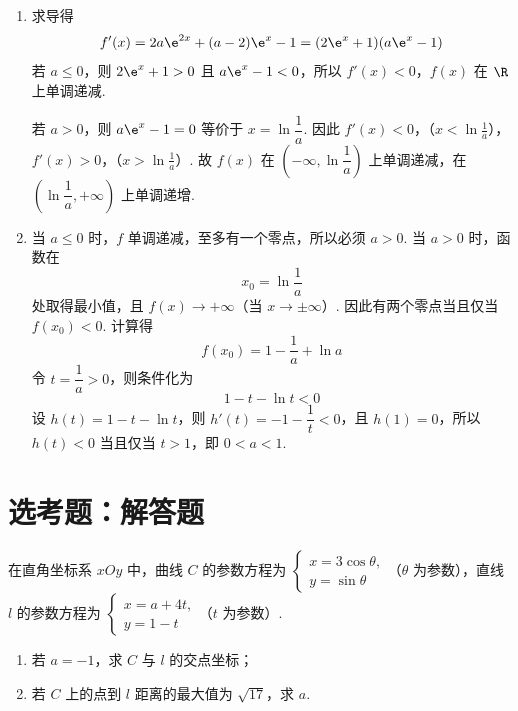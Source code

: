 \begin{solution}
\begin{enumerate}
\item 求导得
\[
f'(x)=2a\e^{2x}+(a-2)\e^x-1=(2\e^x+1)(a\e^x-1)
\]
若 \(a\le0\)，则 \(2\e^x+1>0\) 且 \(a\e^x-1<0\)，所以 \(f'(x)<0\)，\(f(x)\) 在 \(\R\) 上单调递减.

若 \(a>0\)，则 \(a\e^x-1=0\) 等价于 \(x=\ln\dfrac1a\). 因此
\(f'(x)<0\)，（\(x<\ln\frac1a\)），\(f'(x)>0\)，（\(x>\ln\frac1a\)）.
故 \(f(x)\) 在 \(\left(-\infty,\ln\dfrac1a\right)\) 上单调递减，在 \(\left(\ln\dfrac1a,+\infty\right)\) 上单调递增.

\item 当 \(a\le0\) 时，\(f\) 单调递减，至多有一个零点，所以必须 \(a>0\). 当 \(a>0\) 时，函数在
\[
x_0=\ln\frac1a
\]
处取得最小值，且 \(f(x)\to+\infty\)（当 \(x\to\pm\infty\)）. 因此有两个零点当且仅当 \(f(x_0)<0\). 计算得
\[
f(x_0)=1-\frac1a+\ln a
\]
令 \(t=\dfrac1a>0\)，则条件化为
\[
1-t-\ln t<0
\]
设 \(h(t)=1-t-\ln t\)，则 \(h'(t)=-1-\dfrac1t<0\)，且 \(h(1)=0\)，所以 \(h(t)<0\) 当且仅当 \(t>1\)，即 \(0<a<1\).
\end{enumerate}
\end{solution}

\section{选考题：解答题}

\begin{problem}
在直角坐标系 \(xOy\) 中，曲线 \(C\) 的参数方程为
\(\begin{cases}
x=3\cos\theta,\\
y=\sin\theta
\end{cases}\)（\(\theta\) 为参数），直线 \(l\) 的参数方程为
\(\begin{cases}
x=a+4t,\\
y=1-t
\end{cases}\)（\(t\) 为参数）.

\begin{enumerate}
\item 若 \(a=-1\)，求 \(C\) 与 \(l\) 的交点坐标；
\item 若 \(C\) 上的点到 \(l\) 距离的最大值为 \(\sqrt{17}\)，求 \(a\).
\end{enumerate}
\end{problem}

